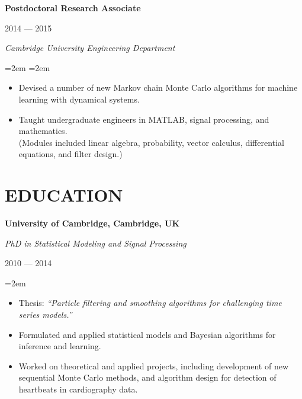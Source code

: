 \documentclass[letterpaper,10pt]{article}
\newcommand{\sepspace}{\vspace*{0.3em}}
\newcommand{\NewPart}[1]{\vspace{-1em} \section*{\uppercase{#1}}}
\newcommand{\MainHeading}[1]{\noindent\textbf{#1}}
\newcommand{\SubHeading}[1]{\noindent\textit{#1}}
\newcommand{\DateBox}[1]{\colorbox{light-gray}{\parbox{8em}{\hfill\color{White}#1}}}
\newcommand{\Details}[1]{\hangindent=2em\hangafter=0\small#1\normalsize\par}
\newcommand{\WorkEntry}[4]{%
                \MainHeading{#1} \hfill \DateBox{#2} \par
                \SubHeading{#3} \par
                \noindent \hangindent=2em \hangafter=0 \Details{#4} }
\newcommand{\EducationEntry}[3]{%
                \SubHeading{#1} \hfill \DateBox{#2} \par
                \Details{#3} }
\begin{document}
\WorkEntry{Postdoctoral Research Associate}{2014 --- 2015}{Cambridge University Engineering Department}{
\begin{itemize}
 \item Devised a number of new Markov chain Monte Carlo algorithms for machine learning with dynamical systems.
 \item Taught undergraduate engineers in MATLAB, signal processing, and mathematics. \\ (Modules included linear algebra, probability, vector calculus, differential equations, and filter design.)
\end{itemize}
}
\sepspace









\NewPart{Education}

\MainHeading{University of Cambridge, Cambridge, UK}

\EducationEntry{PhD in Statistical Modeling and Signal Processing}{2010 --- 2014}{
\begin{itemize}
 \item Thesis: \textit{``Particle filtering and smoothing algorithms for challenging time series models.''}
 \item Formulated and applied statistical models and Bayesian algorithms for inference and learning.
 \item Worked on theoretical and applied projects, including development of new sequential Monte Carlo methods, and algorithm design for detection of heartbeats in cardiography data.
\end{itemize}
}
\sepspace
\end{document}
